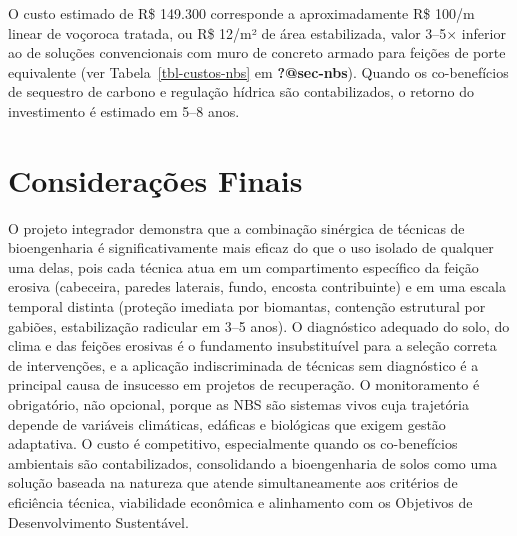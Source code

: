 \documentclass[
  portuguese,
  11pt,
  a4paper,
  open=any]{scrbook}
\begin{document}
\begin{tcolorbox}[enhanced jigsaw, leftrule=.75mm, colframe=quarto-callout-tip-color-frame, colback=white, bottomrule=.15mm, opacityback=0, colbacktitle=quarto-callout-tip-color!10!white, breakable, bottomtitle=1mm, opacitybacktitle=0.6, title=\textcolor{quarto-callout-tip-color}{\faLightbulb}\hspace{0.5em}{Custo-benefício}, titlerule=0mm, toprule=.15mm, toptitle=1mm, rightrule=.15mm, left=2mm, arc=.35mm, coltitle=black]

O custo estimado de R\$ 149.300 corresponde a aproximadamente R\$ 100/m
linear de voçoroca tratada, ou R\$ 12/m² de área estabilizada, valor
3--5× inferior ao de soluções convencionais com muro de concreto armado
para feições de porte equivalente (ver Tabela~\ref{tbl-custos-nbs} em
\textbf{?@sec-nbs}). Quando os co-benefícios de sequestro de carbono e
regulação hídrica são contabilizados, o retorno do investimento é
estimado em 5--8 anos.

\end{tcolorbox}

\section{Considerações Finais}\label{considerauxe7uxf5es-finais}

O projeto integrador demonstra que a combinação sinérgica de técnicas de
bioengenharia é significativamente mais eficaz do que o uso isolado de
qualquer uma delas, pois cada técnica atua em um compartimento
específico da feição erosiva (cabeceira, paredes laterais, fundo,
encosta contribuinte) e em uma escala temporal distinta (proteção
imediata por biomantas, contenção estrutural por gabiões, estabilização
radicular em 3--5 anos). O diagnóstico adequado do solo, do clima e das
feições erosivas é o fundamento insubstituível para a seleção correta de
intervenções, e a aplicação indiscriminada de técnicas sem diagnóstico é
a principal causa de insucesso em projetos de recuperação. O
monitoramento é obrigatório, não opcional, porque as NBS são sistemas
vivos cuja trajetória depende de variáveis climáticas, edáficas e
biológicas que exigem gestão adaptativa. O custo é competitivo,
especialmente quando os co-benefícios ambientais são contabilizados,
consolidando a bioengenharia de solos como uma solução baseada na
natureza que atende simultaneamente aos critérios de eficiência técnica,
viabilidade econômica e alinhamento com os Objetivos de Desenvolvimento
Sustentável.
\end{document}
